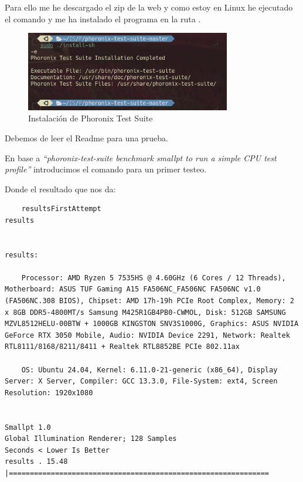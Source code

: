 Para ello me he descargado el zip de la web y como estoy en Linux he ejecutado el comando  y me ha instalado el programa en la ruta .
\begin{figure}[H]
    \centering
    \includegraphics[width=0.8\textwidth]{images/Bloque2/installPhoro.png}
    \caption{Instalación de Phoronix Test Suite}
    \label{fig:PTS}
\end{figure}

Debemos de leer el Readme para una prueba.

En base a \textit{``phoronix-test-suite benchmark smallpt to run a simple CPU test
profile''} introducimos el comando para un primer testeo. 

% 

Donde el resultado que nos da:

\begin{lstlisting}
    resultsFirstAttempt
results


results: 

	Processor: AMD Ryzen 5 7535HS @ 4.60GHz (6 Cores / 12 Threads), Motherboard: ASUS TUF Gaming A15 FA506NC_FA506NC FA506NC v1.0 (FA506NC.308 BIOS), Chipset: AMD 17h-19h PCIe Root Complex, Memory: 2 x 8GB DDR5-4800MT/s Samsung M425R1GB4PB0-CWMOL, Disk: 512GB SAMSUNG MZVL8512HELU-00BTW + 1000GB KINGSTON SNV3S1000G, Graphics: ASUS NVIDIA GeForce RTX 3050 Mobile, Audio: NVIDIA Device 2291, Network: Realtek RTL8111/8168/8211/8411 + Realtek RTL8852BE PCIe 802.11ax

	OS: Ubuntu 24.04, Kernel: 6.11.0-21-generic (x86_64), Display Server: X Server, Compiler: GCC 13.3.0, File-System: ext4, Screen Resolution: 1920x1080


Smallpt 1.0
Global Illumination Renderer; 128 Samples
Seconds < Lower Is Better
results . 15.48 |==============================================================

\end{lstlisting}

